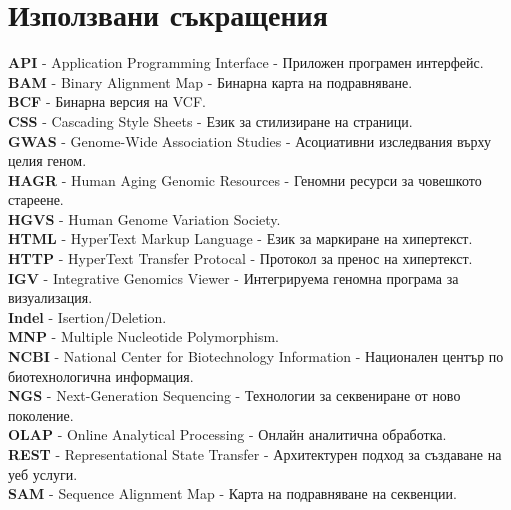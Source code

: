 \documentclass[pdftex,cyrillic,14pt,a4page,twoside,openright]{extreport}
\newcommand\blankpage{%
    \null
    \thispagestyle{empty}%
    \newpage}
\begin{document}
\afterpage{\blankpage}


\renewcommand{\baselinestretch}{0.98}\normalsize
\tableofcontents
\renewcommand{\baselinestretch}{1.0}\normalsize

\pagebreak

\setlength\parindent{0pt}

\chapter*{Използвани съкращения}
\textbf{API} - Application Programming Interface - Приложен програмен интерфейс.\\
\textbf{BAM} - Binary Alignment Map - Бинарна карта на подравняване.\\
\textbf{BCF} - Бинарна версия на VCF.\\
\textbf{CSS} - Cascading Style Sheets - Език за стилизиране на страници.\\
\textbf{GWAS} - Genome-Wide Association Studies - Асоциативни изследвания върху целия геном.\\
\textbf{HAGR} - Human Aging Genomic Resources - Геномни ресурси за човешкото стареене.\\
\textbf{HGVS} - Human Genome Variation Society.\\
\textbf{HTML} - HyperText Markup Language - Език за маркиране на хипертекст.\\
\textbf{HTTP} - HyperText Transfer Protocal - Протокол за пренос на хипертекст.\\
\textbf{IGV} - Integrative Genomics Viewer - Интегрируема геномна програма за визуализация.\\
\textbf{Indel} - Isertion/Deletion.\\
\textbf{MNP} - Multiple Nucleotide Polymorphism.\\
\textbf{NCBI} - National Center for Biotechnology Information - Национален център по биотехнологична информация.\\
\textbf{NGS} -  Next-Generation Sequencing - Технологии за секвениране от ново поколение.\\
\textbf{OLAP} - Online Analytical Processing - Онлайн аналитична обработка.\\
\textbf{REST} - Representational State Transfer - Архитектурен подход за създаване на уеб услуги.\\
\textbf{SAM} - Sequence Alignment Map - Карта на подравняване на секвенции.\\
\end{document}
